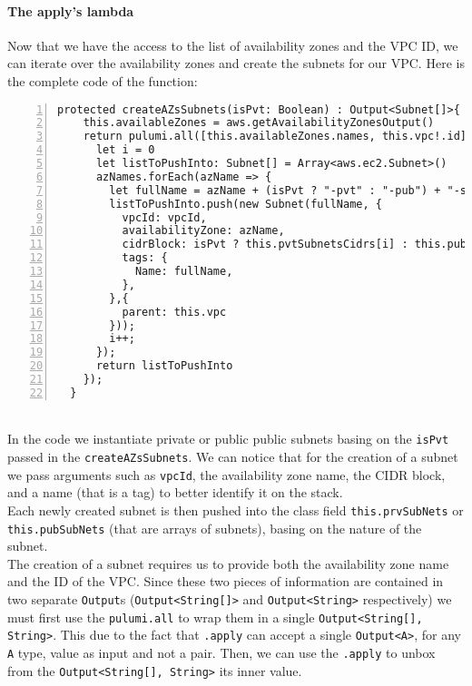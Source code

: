 \paragraph{The apply's lambda}
\label{par:ts-lambda}
Now that we have the access to the list of availability zones and the VPC ID, we can iterate over the availability zones and create the subnets for our VPC.
Here is the complete code of the function:
\begin{lstlisting}[numbers=left, numberstyle=\tiny, numbersep=-5pt, stepnumber=1]
  protected createAZsSubnets(isPvt: Boolean) : Output<Subnet[]>{
    this.availableZones = aws.getAvailabilityZonesOutput()
    return pulumi.all([this.availableZones.names, this.vpc!.id]).apply(([azNames, vpcId]) => {
      let i = 0
      let listToPushInto: Subnet[] = Array<aws.ec2.Subnet>()
      azNames.forEach(azName => {
        let fullName = azName + (isPvt ? "-pvt" : "-pub") + "-subnet-typescript"
        listToPushInto.push(new Subnet(fullName, {
          vpcId: vpcId,
          availabilityZone: azName,
          cidrBlock: isPvt ? this.pvtSubnetsCidrs[i] : this.pubSubnetsCidrs[i],
          tags: {
            Name: fullName,
          },
        },{
          parent: this.vpc
        }));
        i++;
      });
      return listToPushInto
    });
  }
\end{lstlisting}\mbox{}\\
In the code we instantiate private or public public subnets basing on the \texttt{isPvt} passed in the \texttt{createAZsSubnets}.
We can notice that for the creation of a subnet we pass arguments such as \texttt{vpcId}, the availability zone name, the CIDR block, and a name (that is a tag) to better identify it on the stack.\\
Each newly created subnet is then pushed into the class field \texttt{this.prvSubNets} or \texttt{this.pubSubNets} (that are arrays of subnets), basing on the nature of the subnet.\\
The creation of a subnet requires us to provide both the availability zone name and the ID of the VPC.
Since these two pieces of information are contained in two separate \texttt{Output}s (\texttt{Output<String[]>} and \texttt{Output<String>} respectively) we must first use the \texttt{pulumi.all} to wrap them in a single \texttt{Output<String[], String>}.
This due to the fact that \texttt{.apply} can accept a single \texttt{Output<A>}, for any \texttt{A} type, value as input and not a pair.
Then, we can use the \texttt{.apply} to unbox from the \texttt{Output<String[], String>} its inner value.
